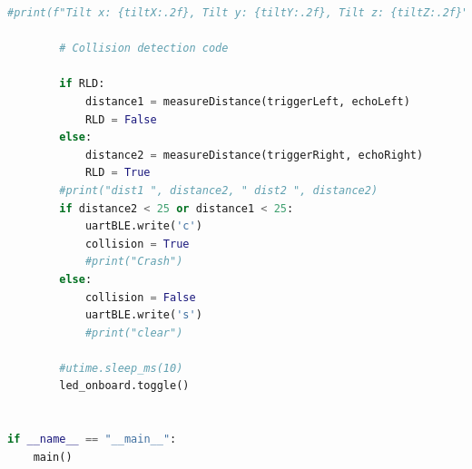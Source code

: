 \documentclass[conference]{IEEEtran}
\begin{document}
\begin{lstlisting}[language=Python, caption=RC Wheelchair Code, label=rc_wheelchair_code]
        #print(f"Tilt x: {tiltX:.2f}, Tilt y: {tiltY:.2f}, Tilt z: {tiltZ:.2f}", end='\r')
             
        # Collision detection code
        
        if RLD:
            distance1 = measureDistance(triggerLeft, echoLeft)
            RLD = False
        else:
            distance2 = measureDistance(triggerRight, echoRight)
            RLD = True
        #print("dist1 ", distance2, " dist2 ", distance2)
        if distance2 < 25 or distance1 < 25:
            uartBLE.write('c')
            collision = True
            #print("Crash")
        else:
            collision = False
            uartBLE.write('s')
            #print("clear")
            
        #utime.sleep_ms(10)
        led_onboard.toggle()
    
        
if __name__ == "__main__":
    main()
    \end{lstlisting}
\end{document}
